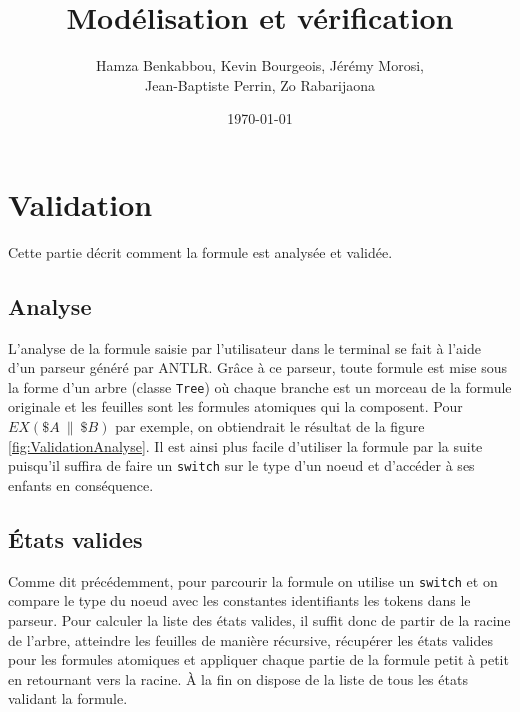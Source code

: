 \documentclass[dvipsnames]{report}
\begin{document}
\title{Modélisation et vérification}   %
\author{Hamza Benkabbou, Kevin Bourgeois, Jérémy Morosi,\\Jean-Baptiste Perrin, Zo Rabarijaona}         %
\date{\today}    %
\maketitle

\tableofcontents

\newpage

\section{Validation}

Cette partie décrit comment la formule est analysée et validée.

\subsection{Analyse}

L'analyse de la formule saisie par l'utilisateur dans le terminal se fait à l'aide d'un parseur généré par ANTLR. Grâce à ce parseur, toute formule est mise sous la forme d'un arbre (classe \texttt{Tree}) où chaque branche est un morceau de la formule originale et les feuilles sont les formules atomiques qui la composent. Pour $EX(\$A~\|~\$B)$ par exemple, on obtiendrait le résultat de la figure \ref{fig:ValidationAnalyse}. Il est ainsi plus facile d'utiliser la formule par la suite puisqu'il suffira de faire un \texttt{switch} sur le type d'un noeud et d'accéder à ses enfants en conséquence.



\subsection{\'{E}tats valides}

Comme dit précédemment, pour parcourir la formule on utilise un \texttt{switch} et on compare le type du noeud avec les constantes identifiants les tokens dans le parseur. Pour calculer la liste des états valides, il suffit donc de partir de la racine de l'arbre, atteindre les feuilles de manière récursive, récupérer les états valides pour les formules atomiques et appliquer chaque partie de la formule petit à petit en retournant vers la racine. \`{A} la fin on dispose de la liste de tous les états validant la formule.
\end{document}
